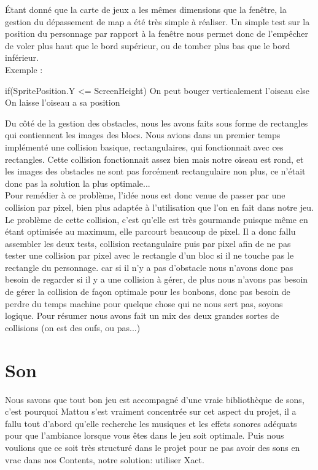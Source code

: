\documentclass [11pt]{report}
\begin{document}
		\indent Étant donné que la carte de jeux a les mêmes dimensions que la fenêtre, la gestion du dépassement de map a été très simple à réaliser. Un simple test sur la position du personnage par rapport à la fenêtre nous permet donc de l'empêcher de voler plus haut que le bord supérieur, ou de tomber plus bas que le bord inférieur. \\


	\newpage
		\noindent Exemple :
		
		\begin{mylisting}
		
if(SpritePosition.Y <= ScreenHeight)
{
	   On peut bouger verticalement l'oiseau
}
else
{
	   On laisse l'oiseau a sa position
}
		\end{mylisting}
	\vspace{10mm}
		
				
		\indent Du côté de la gestion des obstacles, nous les avons faits sous forme de rectangles qui contiennent les images des blocs. Nous avions dans un premier temps implémenté une collision basique, rectangulaires, qui fonctionnait avec ces rectangles. Cette collision fonctionnait assez bien mais notre oiseau est rond, et les images des obstacles ne sont pas forcément rectangulaire non plus, ce n'était donc pas la solution la plus optimale... \\
		\indent Pour remédier à ce problème, l'idée nous est donc venue de passer par une collision par pixel, bien plus adaptée à l'utilisation que l'on en fait dans notre jeu. Le problème de cette collision, c'est qu'elle est très gourmande puisque même en étant optimisée au maximum, elle parcourt beaucoup de pixel. Il a donc fallu assembler les deux tests, collision rectangulaire puis par pixel afin de ne pas tester une collision par pixel avec le rectangle d'un bloc si il ne touche pas le rectangle du personnage. car si il n'y a pas d'obstacle nous n'avons donc pas besoin de regarder si il y a une collision à gérer, de plus nous n'avons pas besoin de gérer la collision de façon optimale pour les bonbons, donc pas besoin de perdre du temps machine pour quelque chose qui ne nous sert pas, soyons logique. Pour résumer nous avons fait un mix des deux grandes sortes de collisions (on est des oufs, ou pas...)
		
		\newpage
	
	\section{Son}
		Nous savons que tout bon jeu est accompagné d'une vraie bibliothèque de sons, c'est pourquoi Mattou s'est vraiment concentrée sur cet aspect du projet, il a fallu tout d'abord qu'elle recherche les musiques et les effets sonores adéquats pour que l'ambiance lorsque vous êtes dans le jeu soit optimale. Puis nous voulions que ce soit très structuré dans le projet pour ne pas avoir des sons en vrac dans nos Contents, notre solution: utiliser Xact. \\
		
\end{document}
